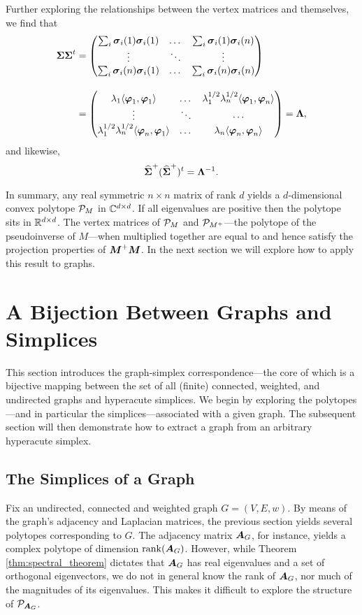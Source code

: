 Further exploring the relationships between the vertex matrices and themselves, we find that 
\begin{align}
\Sv\Sv^\tp &= 
\begin{pmatrix}
\sum_i \sv_i(1)\sv_i(1) & \dots & \sum_i \sv_i(1)\sv_i(n) \\
\vdots &\ddots  & \vdots \\
\sum_i \sv_i(n)\sv_i(1) & \dots & \sum_i \sv_i(n)\sv_i(n)
\end{pmatrix}\notag 
\\[10pt] 
&= 
\begin{pmatrix}
\lambda_1 \la \vp_1,\vp_1\ra & \dots & \lambda_1^{1/2}\lambda_n^{1/2}\la \vp_1,\vp_n\ra \\
\vdots & \ddots & \cdots \\
\lambda_1^{1/2}\lambda_n^{1/2}\la \vp_n,\vp_1\ra & \dots &\lambda_n \la \vp_n,\vp_n\ra 
\end{pmatrix} = \Eval,\label{eq:SvSv^t}
\end{align}
and likewise, 
\begin{equation}
\label{eq:SvSv+}
\Svn^+(\Svn^+)^\tp = \Eval^{-1}.
\end{equation}

In summary, any real symmetric $n\times n$ matrix of rank $d$ yields a $d$-dimensional convex polytope $\P_M$ in $\C^{d\times d}$. If all eigenvalues are positive then the polytope sits in $\R^{d\times d}$. The vertex matrices of $\P_M$ and $\P_{M^+}$---the polytope of the pseudoinverse of $M$---when multiplied together are equal to and hence satisfy the projection properties of $\M^+\M$. In the next section we will explore how to apply this result to graphs. 


\section{A Bijection Between Graphs and Simplices}
\label{sec:bijection_graphs_simplices}
This section introduces the graph-simplex correspondence---the core of which is a bijective mapping between the set of all (finite) connected, weighted, and undirected graphs and hyperacute simplices. 
We begin by exploring the polytopes---and in particular the simplices---associated with a given graph. The subsequent section will then demonstrate how to extract a graph from an arbitrary hyperacute simplex. 

\subsection{The Simplices of a Graph}
\label{sec:graph_to_simplex}
Fix an undirected, connected and weighted graph $G=(V,E,w)$. By means of the graph's adjacency and Laplacian matrices, the previous section yields several polytopes corresponding to $G$. 
The adjacency matrix $\A_G$, for instance, yields a complex polytope of dimension $\rank(\A_G)$. However, while Theorem \ref{thm:spectral_theorem} dictates that $\A_G$ has real eigenvalues and a set of orthogonal eigenvectors, we do not in general know the rank of $\A_G$, nor much of the magnitudes of its eigenvalues. This makes it difficult to explore the structure of $\P_{\A_G}$. 


